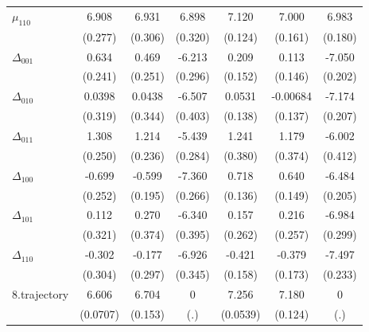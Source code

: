 {\begin{tabular}{l*{6}{c}}
$\mu_{110}$&    6.908\sym{***}&    6.931\sym{***}&    6.898\sym{***}&    7.120\sym{***}&    7.000\sym{***}&    6.983\sym{***}\\
          &  (0.277)         &  (0.306)         &  (0.320)         &  (0.124)         &  (0.161)         &  (0.180)         \\
$\Delta_{001}$&    0.634\sym{***}&    0.469\sym{*}  &   -6.213\sym{***}&    0.209         &    0.113         &   -7.050\sym{***}\\
          &  (0.241)         &  (0.251)         &  (0.296)         &  (0.152)         &  (0.146)         &  (0.202)         \\
$\Delta_{010}$&   0.0398         &   0.0438         &   -6.507\sym{***}&   0.0531         & -0.00684         &   -7.174\sym{***}\\
          &  (0.319)         &  (0.344)         &  (0.403)         &  (0.138)         &  (0.137)         &  (0.207)         \\
$\Delta_{011}$&    1.308\sym{***}&    1.214\sym{***}&   -5.439\sym{***}&    1.241\sym{***}&    1.179\sym{***}&   -6.002\sym{***}\\
          &  (0.250)         &  (0.236)         &  (0.284)         &  (0.380)         &  (0.374)         &  (0.412)         \\
$\Delta_{100}$&   -0.699\sym{***}&   -0.599\sym{***}&   -7.360\sym{***}&    0.718\sym{***}&    0.640\sym{***}&   -6.484\sym{***}\\
          &  (0.252)         &  (0.195)         &  (0.266)         &  (0.136)         &  (0.149)         &  (0.205)         \\
$\Delta_{101}$&    0.112         &    0.270         &   -6.340\sym{***}&    0.157         &    0.216         &   -6.984\sym{***}\\
          &  (0.321)         &  (0.374)         &  (0.395)         &  (0.262)         &  (0.257)         &  (0.299)         \\
$\Delta_{110}$&   -0.302         &   -0.177         &   -6.926\sym{***}&   -0.421\sym{***}&   -0.379\sym{**} &   -7.497\sym{***}\\
          &  (0.304)         &  (0.297)         &  (0.345)         &  (0.158)         &  (0.173)         &  (0.233)         \\
8.trajectory#1.impmaize&    6.606\sym{***}&    6.704\sym{***}&        0         &    7.256\sym{***}&    7.180\sym{***}&        0         \\
          & (0.0707)         &  (0.153)         &      (.)         & (0.0539)         &  (0.124)         &      (.)         \\

\end{tabular}}
